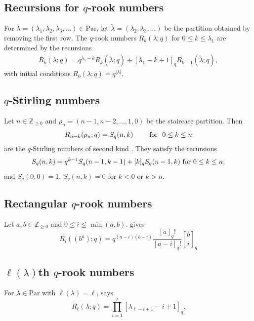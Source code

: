 \documentclass[12pt,reqno]{amsart}
\theoremstyle{plain}
\theoremstyle{definition}
\theoremstyle{remark}
\theoremstyle{example}
\numberwithin{equation}{section}
\newcommand\ZZ{\mathbb{Z}}
\newcommand\Par{\mathrm{Par}}
\begin{document}
\subsection{Recursions for $q$-rook numbers}\label{sec:recforqrook}For $\lambda = (\lambda_1,\lambda_2,\lambda_3,\ldots) \in \Par$, let $\widetilde{\lambda} = (\lambda_2,\lambda_3,\ldots)$ be the partition obtained by removing the first row. The  $q$-rook numbers $R_k(\lambda;q)$ for $0 \leq k \leq \lambda_1$ are determined by the recursions \cite[Theorem 1.1]{Garsia_Remmel_rook} \begin{align}\label{eq:GarsiaRemmelrec}
	R_k(\lambda;q) = q^{\lambda_1-k}R_k(\widetilde{\lambda};q) + [\lambda_1-k+1]_q R_{k-1}(\widetilde{\lambda};q), 
\end{align} with initial conditions $R_0(\lambda;q) = q^{|\lambda|}$.

\subsection{$q$-Stirling numbers}Let $n \in \ZZ_{\geq 0}$ and $\rho_n = (n-1,n-2,\ldots,1,0)$ be the staircase partition. Then \begin{equation}\label{eq:qStirling2}
R_{n-k}(\rho_n;q) = S_q(n,k) \qquad \hbox{ for } \ 0 \leq k \leq n
\end{equation} are the $q$-Stirling numbers of second kind \cite[(I.9)]{Garsia_Remmel_rook}. They satisfy the recursions $$ S_q(n,k) = q^{k-1}S_q(n-1,k-1) + [k]_q S_q(n-1,k) \hbox{ for } 0 \leq k \leq n,$$ and $S_q(0,0) = 1$, $S_q(n,k) = 0$ for $k<0$ or $k>n$.

\subsection{Rectangular $q$-rook numbers}
Let $a,b \in \ZZ_{\geq 0}$ and $0 \leq i \leq \min(a,b)$. \cite[Proposition 2.15]{CMP_rook} gives 
\begin{equation}\label{eq:rectangleqrook}
	R_i((b^a);q) = q^{(a-i)(b-i)} \dfrac{[a]_q!}{[a-i]_q!} {b \brack i}_q
\end{equation}

\subsection{$\ell(\lambda)$th $q$-rook numbers}

For $\lambda \in \Par$ with $\ell(\lambda) = \ell$,  \cite[Proposition 2.2]{CMP_rook} says
\begin{equation}\label{eq:Rlastprod}
	R_{\ell}(\lambda;q) = \prod_{i =1}^{\ell}[\lambda_{\ell-i+1}-i+1]_q.
\end{equation} 
\end{document}
